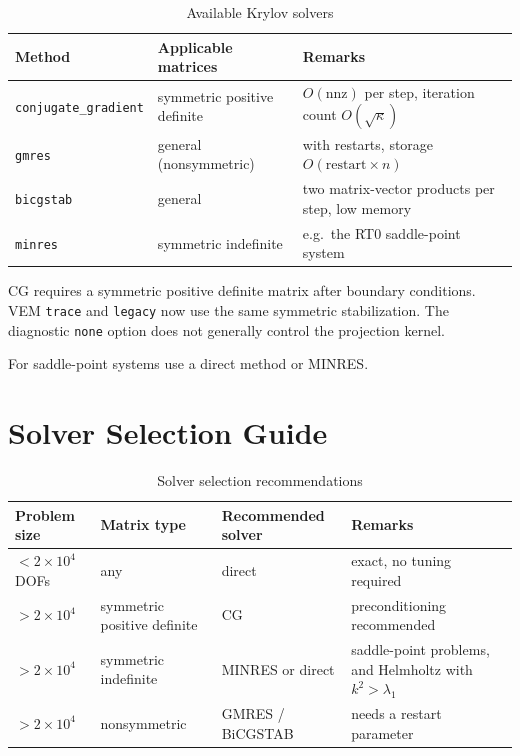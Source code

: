\documentclass[11pt,oneside]{book}
\theoremstyle{definition}
\theoremstyle{plain}
\newenvironment{caution}{%
  \begin{tcolorbox}[colback=orange!5,colframe=orange!55,title=Caution,fonttitle=\bfseries]%
}{%
  \end{tcolorbox}%
}
\newcommand{\code}[1]{\texttt{#1}}
\begin{document}
\begin{table}[htbp]
\centering
\caption{Available Krylov solvers}
\label{tab:krylov}
\begin{lrbox}{\guideTableBox}
\begin{tabular}{@{}llp{6.4cm}@{}}
\toprule
Method & Applicable matrices & Remarks \\
\midrule
\code{conjugate\_\allowbreak gradient} & symmetric positive definite & $O(\mathrm{nnz})$ per step, iteration count $O(\sqrt{\kappa})$ \\
\code{gmres} & general (nonsymmetric) & with restarts, storage $O(\text{restart}\times n)$ \\
\code{bicgstab} & general & two matrix-vector products per step, low memory \\
\code{minres} & symmetric indefinite & e.g.\ the RT0 saddle-point system \\
\bottomrule
\end{tabular}
\end{lrbox}%
\ifdim\wd\guideTableBox>\linewidth
  \resizebox{\linewidth}{!}{\usebox{\guideTableBox}}%
\else\usebox{\guideTableBox}\fi
\end{table}

\begin{caution}
CG requires a symmetric positive definite matrix after boundary conditions.
VEM \code{trace} and \code{legacy} now use the same symmetric stabilization.
The diagnostic \code{none} option does not generally control the projection kernel.

For saddle-point systems use a direct method or MINRES.
\end{caution}

\section{Solver Selection Guide}

\begin{table}[htbp]
\centering
\caption{Solver selection recommendations}
\label{tab:solver-guide}
\begin{lrbox}{\guideTableBox}
\begin{tabular}{@{}llll@{}}
\toprule
Problem size & Matrix type & Recommended solver & Remarks \\
\midrule
$<2\times10^4$ DOFs & any & direct & exact, no tuning required \\
$>2\times10^4$ & symmetric positive definite & CG & preconditioning recommended \\
$>2\times10^4$ & symmetric indefinite & MINRES or direct & saddle-point problems, and Helmholtz with $k^2>\lambda_1$ \\
$>2\times10^4$ & nonsymmetric & GMRES / BiCGSTAB & needs a restart parameter \\
\bottomrule
\end{tabular}
\end{lrbox}%
\ifdim\wd\guideTableBox>\linewidth
  \resizebox{\linewidth}{!}{\usebox{\guideTableBox}}%
\else\usebox{\guideTableBox}\fi
\end{table}
\end{document}
